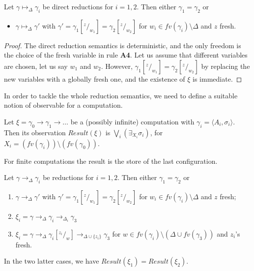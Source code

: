 \documentclass[main.tex]{subfiles}
\begin{document}
\begin{lemma}\label{lemma:uptoD}
Let $\gamma \mapsto_\Delta \gamma_i$ be direct reductions for $i =  1, 2$.
Then either $\gamma_1 = \gamma_2$ or
\begin{itemize}
\item $\gamma \mapsto_\Delta \gamma'$ with 
$\gamma' = \gamma_1[^z/_{w_1}] =  \gamma_2[^z/_{w_2}]$
for $w_i \in fv(\gamma_i) \setminus \Delta$ and $z$ fresh.
\end{itemize}
\end{lemma}

\begin{proof}
The direct reduction semantics is deterministic, and the only freedom is the choice 
of the fresh variable in rule {\bf A4}. 
Let us assume that  different variables are chosen, let us say $w_1$ and $w_2$.
However, $\gamma_1[^z/_{w_1}] =  \gamma_2[^z/_{w_2}]$ by replacing the new variables 
with a globally fresh one, and the existence of $\xi$ is immediate.
\end{proof}

In order to tackle the whole reduction semantics, we need to define a suitable notion of observable for a computation.

\begin{definition}[Observables]\label{def:observables}
Let $\xi = \gamma_0  \rightarrow \gamma_1  \rightarrow \dots$ be a (possibly infinite) computation with $\gamma_i = \langle A_i, \sigma_i\rangle$.
%
Then its observation $\mathit{Result}(\xi)$ 
is $\bigvee_i (\exists_{X_i} \sigma_i)$, for $X_i = (fv(\gamma_i))\setminus(fv(\gamma_0))$.
\end{definition}

For finite computations the result is the store of the last configuration.

\begin{proposition}\label{lemma:upto}
Let $\gamma \rightarrow_\Delta \gamma_i$ be reductions for $i =  1, 2$.
Then either $\gamma_1 = \gamma_2$ or 
\begin{enumerate}
\item $\gamma \rightarrow_\Delta  \gamma'$ with 
$\gamma' = \gamma_1[^z/_{w_1}] =  \gamma_2[^z/_{w_2}]$
for $w_i \in fv(\gamma_i) \setminus \Delta$ and $z$ fresh;
\item
$\xi_i = \gamma \rightarrow_\Delta \gamma_i \rightarrow_{\Delta_i} \gamma_3$
\item
$\xi_i = \gamma \rightarrow_\Delta \gamma_i[^{z_i}/_w] \rightarrow_{\Delta \cup \{z_i\}} \gamma_3$
for $w \in fv(\gamma_i) \setminus (\Delta \cup fv(\gamma_3))$ and $z_i$'s fresh.
\end{enumerate}
In the two latter cases, we have $Result(\xi_1) = Result(\xi_2)$.
\end{proposition}
\end{document}
